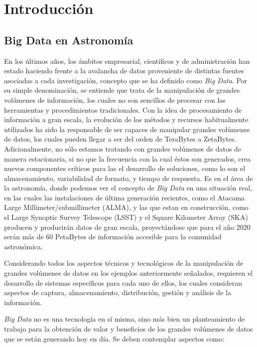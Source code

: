 \section{Introducción}

\subsection{Big Data en Astronomía}

En los últimos años, los ámbitos empresarial, científicos y de administración
han estado haciendo frente a la avalancha de datos proveniente de distintas
fuentes asociadas a cada investigación, concepto que se ha definido como
\emph{Big Data}.
Por su simple denominación, se entiende que trata de la manipulación de grandes
volúmenes de información, los cuales no son sencillos de procesar con las herramientas
y procedimientos tradicionales.
Con la idea de procesamiento de información a gran escala,
la evolución de los métodos y recursos habitualmente utilizados
ha sido la responsable de ser capaces de manipular grandes volúmenes de datos,
los cuales pueden llegar a ser del orden de TeraBytes a ZetaBytes.
Adicionalmente, no sólo estamos tratando con grandes volúmenes de datos
de manera estacionaria, si no que la frecuencia con la cual éstos son generados,
crea nuevos componentes críticos para las el desarrollo de soluciones,
como lo son el almacenamiento, variabilidad de formato, y tiempo de respuesta.
Es en el área de la astronomía, donde podemos ver el concepto de \emph{Big Data}
en una situación real, en las cuales las instalaciones de última generación
recientes, como el Atacama Large Millimeter/submillimeter (ALMA),
y las que estan en construcción, como el Large Synoptic Survey Telescope (LSST) y el
Square Kilometer Array (SKA)
producen y producirán datos de gran escala, proyectándose que para el año 2020
serán más de 60 PetaBytes de información accesible para la comunidad astronómica.

Considerando todos los aspectos técnicos y tecnológicos de la manipulación
de grandes volúmenes de datos en los ejemplos anteriormente señalados, requieren
el desarrollo de sistemas específicos para cada uno de ellos,
los cuales consideran aspectos de captura, almacenamiento, distribución, gestión
y análisis de la información.

\emph{Big Data} no es una tecnología en sí misma, sino más bien un planteamiento de
trabajo para la obtención de valor y beneficios de los grandes volúmenes de
datos que se están generando hoy en día. Se deben contemplar aspectos como:


